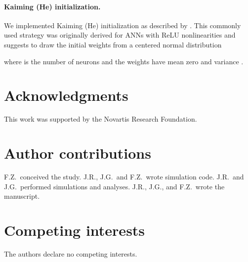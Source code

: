 \documentclass[11pt,a4paper]{article}
\begin{document}
\paragraph{Kaiming (He) initialization.}
We implemented Kaiming (He) initialization as described by \citet{He2015-kv}. 
This commonly used strategy was originally derived for \acp{ANN} with ReLU nonlinearities and 
suggests to draw the initial weights from a centered normal distribution

where  is the number of neurons and the weights have mean zero and variance
.


\clearpage
\section*{Acknowledgments}
This work was supported by the Novartis Research Foundation. 

\section*{Author contributions}
F.Z.\ conceived the study. 
J.R., J.G.\ and F.Z.\ wrote simulation code.
J.R.\ and J.G.\ performed simulations and analyses. 
J.R., J.G., and F.Z.\ wrote the manuscript.

\section*{Competing interests}
The authors declare no competing interests.




\printbibliography
\end{document}
